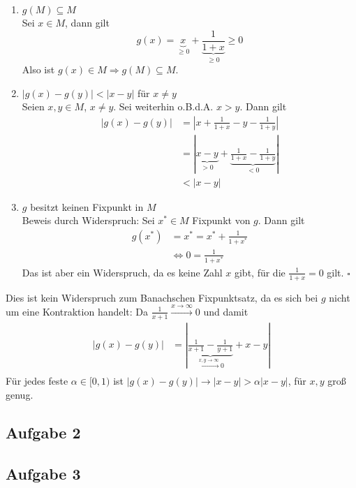 \documentclass[11pt,a4paper,ngerman]{article}
\begin{document}
\begin{enumerate}
\item $g(M) \subseteq M$\\
  Sei $x \in M$, dann gilt 
  \begin{equation*}
    g(x) = \underbrace{x}_{\geq 0} + \underbrace{\frac{1}{1+x}}_{\geq 0} \geq 0
  \end{equation*}
  Also ist $g(x) \in M \Rightarrow g(M) \subseteq M$.
\item $|g(x) - g(y)| < |x-y|$ für $x \neq y$\\
  Seien $x,y \in M$, $x \neq y$. Sei weiterhin o.B.d.A. $x > y$. Dann gilt
  \begin{equation*}\begin{split}
    |g(x) - g(y)| &= |x + \frac{1}{1+x} - y - \frac{1}{1+y}|\\
                  &= |\underbrace{x - y}_{> 0} + \underbrace{\frac{1}{1+x} - \frac{1}{1+y}}_{< 0}| \\
                  &< |x - y|
  \end{split}\end{equation*}
\item $g$ besitzt keinen Fixpunkt in $M$\\
  Beweis durch Widerspruch: Sei $x^* \in M$ Fixpunkt von $g$. Dann gilt
  \begin{equation*}\begin{split}
    g(x^*) &= x^* = x^* + \frac{1}{1+ x^*}\\
    &\Leftrightarrow 0 = \frac{1}{1 + x^*}
  \end{split}\end{equation*}
  Das ist aber ein Widerspruch, da es keine Zahl $x$ gibt, für die $\frac{1}{1+x} = 0$ gilt.
  \mbox{} \hfill $\square$
\end{enumerate}
Dies ist kein Widerspruch zum Banachschen Fixpunktsatz, da es sich bei $g$ nicht um eine
Kontraktion handelt: Da $\frac{1}{x+1} \stackrel{x \to \infty}{\to} 0$ und damit
\begin{equation*}\begin{split}
|g(x) - g(y)| &= |\underbrace{\frac{1}{x+1} - \frac{1}{y+1}}_{\stackrel{x,y \to \infty}{\to} 0}  + x- y| \\
\end{split}\end{equation*} 
Für jedes feste $\alpha \in [0,1)$ ist $|g(x) - g(y)| \to |x-y| > \alpha|x-y|$, für $x,y$ groß genug.

\subsection*{Aufgabe 2}

\subsection*{Aufgabe 3}

\label{LastPage}
\end{document}
